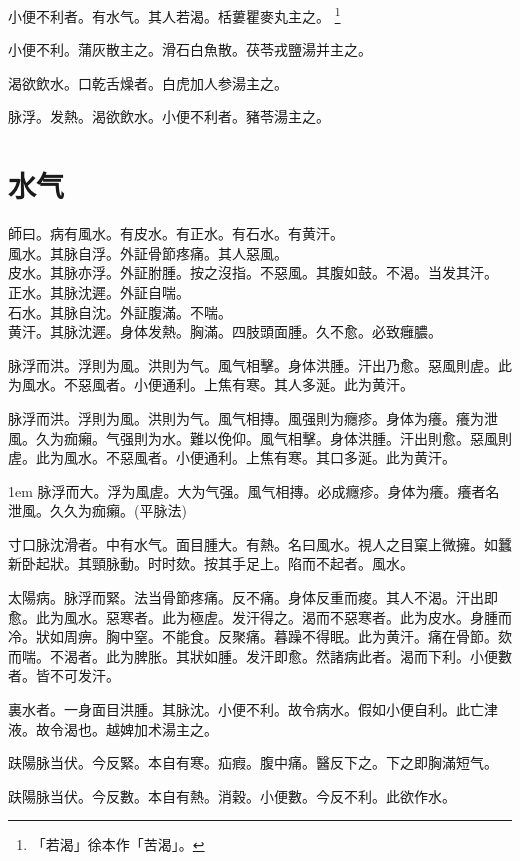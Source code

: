 小便不利者。有水气。其人若渴。栝蔞瞿麥丸主之。
	\footnote{
		「若渴」徐本作「苦渴」。
	}

小便不利。蒲灰散主之。滑石白魚散。茯苓戎鹽湯并主之。

渴欲飲水。口乾舌燥者。白虎加人参湯主之。

脉浮。发熱。渴欲飲水。小便不利者。豬苓湯主之。

\chapter{水气}

師曰。病有風水。有皮水。有正水。有石水。有黄汗。\\
風水。其脉自浮。外証骨節疼痛。{\khaaitp 其人}惡風。\\
皮水。其脉亦浮。外証胕腫。按之沒指。不惡風。其腹如鼓。不渴。当发其汗。\\
正水。其脉沈遲。外証自喘。\\
石水。其脉自沈。外証腹滿。不喘。\\
黄汗。其脉沈遲。身{\khaaitp 体}发熱。胸滿。四肢頭面腫。久不愈。必致癰膿。

脉浮而洪。浮則为風。洪則为气。風气相擊。身体洪腫。汗出乃愈。惡風則虗。此为風水。不惡風者。小便通利。上焦有寒。其人多涎。此为黄汗。{\wuben}

脉浮而洪。浮則为風。洪則为气。風气相摶。風强則为癮疹。身体为癢。癢为泄風。久为痂癩。气强則为水。難以俛仰。風气相擊。身体洪腫。汗出則愈。惡風則虗。此为風水。不惡風者。小便通利。上焦有寒。其口多涎。此为黄汗。{\dengben}

\hangindent 1em
脉浮而大。浮为風虗。大为气强。風气相摶。必成癮疹。身体为癢。癢者名泄風。久久为痂癩。(平脉法)

寸口脉沈滑者。中有水气。面目腫大。有熱。名曰風水。視人之目窠上微擁。如{\khaaitp 蠶}新卧起狀。其頸脉動。时时欬。按其手足上。陷而不起者。風水。

太陽病。脉浮而緊。法当骨節疼痛。反不痛。身体反重而痠。其人不渴。汗出即愈。此为風水。惡寒者。此为極虗。发汗得之。渴而不惡寒者。此为皮水。身腫而冷。狀如周痹。胸中窒。不能食。反聚痛。暮躁不得眠。此为黄汗。痛在骨節。欬而喘。不渴者。此为脾胀。其狀如腫。发汗即愈。然諸病此者。渴而下利。小便數者。皆不可发汗。

裏水者。一身面目洪腫。其脉沈。小便不利。故令病水。假如小便自利。此亡津液。故令渴也。越婢加术湯主之。

趺陽脉当伏。今反緊。本自有寒。疝瘕。腹中痛。醫反下之。下之即胸滿短气。

趺陽脉当伏。今反數。本自有熱。消穀。小便數。今反不利。此欲作水。

